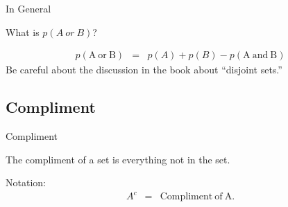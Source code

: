\begin{frame}{In General}

  What is $p(A~or~B)$?

  {

    \begin{eqnarray*}
      p(\mathrm{A~or~B}) & = & p(A) + p(B) - p(\mathrm{A~and~B})
    \end{eqnarray*}
    Be careful about the discussion in the book about ``disjoint sets.''

  }
  
\end{frame}

\subsection{Compliment}

\begin{frame}{Compliment}

  The compliment of a set is everything not in the set.

  Notation:
  \begin{eqnarray*}
    A^c & = & \mathrm{Compliment~of~A}.
  \end{eqnarray*}

  
\end{frame}

